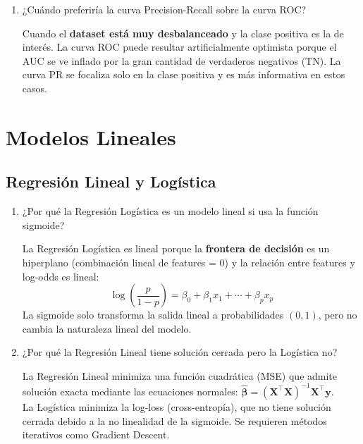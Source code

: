 \documentclass[11pt,a4paper]{article}
\begin{document}
\begin{enumerate}[label=\textbf{P\arabic*.}, resume]
\item ¿Cu\'ando preferir\'ia la curva Precision-Recall sobre la curva ROC?

\begin{answerbox}
Cuando el \textbf{dataset est\'a muy desbalanceado} y la clase positiva es la de inter\'es.
La curva ROC puede resultar artificialmente optimista porque el AUC se ve inflado por la
gran cantidad de verdaderos negativos (TN). La curva PR se focaliza solo en la clase
positiva y es m\'as informativa en estos casos.
\end{answerbox}

\end{enumerate}

\section{Modelos Lineales}

\subsection{Regresi\'on Lineal y Log\'istica}

\begin{enumerate}[label=\textbf{P\arabic*.}, resume]

\item ¿Por qu\'e la Regresi\'on Log\'istica es un modelo lineal si usa la funci\'on sigmoide?

\begin{answerbox}
La Regresi\'on Log\'istica es lineal porque la \textbf{frontera de decisi\'on} es un
hiperplano (combinaci\'on lineal de features = 0) y la relaci\'on entre features y
log-odds es lineal:
\[
  \log\!\left(\frac{p}{1-p}\right) = \beta_0 + \beta_1 x_1 + \cdots + \beta_p x_p
\]
La sigmoide solo transforma la salida lineal a probabilidades $(0,1)$, pero no cambia
la naturaleza lineal del modelo.
\end{answerbox}

\item ¿Por qu\'e la Regresi\'on Lineal tiene soluci\'on cerrada pero la Log\'istica no?

\begin{answerbox}
La Regresi\'on Lineal minimiza una funci\'on cuadr\'atica (MSE) que admite soluci\'on
exacta mediante las ecuaciones normales: $\hat{\boldsymbol{\beta}} = (\mathbf{X}^\top\mathbf{X})^{-1}\mathbf{X}^\top\mathbf{y}$.\\[4pt]
La Log\'istica minimiza la log-loss (cross-entrop\'ia), que no tiene soluci\'on cerrada
debido a la no linealidad de la sigmoide. Se requieren m\'etodos iterativos como
Gradient Descent.
\end{answerbox}

\end{enumerate}
\end{document}
